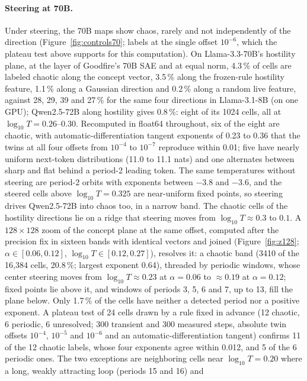 \documentclass[11pt,letterpaper]{article}
\begin{document}
\paragraph{Steering at 70B.} Under steering, the 70B maps show chaos, rarely and not independently of the
direction (Figure~\ref{fig:controls70}; labels at the single offset $10^{-6}$, which the plateau test above supports
for this computation). On Llama-3.3-70B's
hostility plane, at the layer of Goodfire's 70B SAE and at equal norm, 4.3\,\% of cells are labeled chaotic along the
concept vector, 3.5\,\% along the frozen-rule hostility feature, 1.1\,\% along a Gaussian direction and 0.2\,\% along
a random live feature, against 28, 29, 39 and 27\,\% for the same four directions in Llama-3.1-8B (on one GPU);
Qwen2.5-72B along hostility gives 0.8\,\%: eight of its 1024 cells, all at $\log_{10}T=0.26$--$0.30$. Recomputed in float64
throughout, six of the eight are chaotic, with automatic-differentiation tangent exponents of 0.23 to 0.36 that the twins at all four
offsets from $10^{-4}$ to $10^{-7}$ reproduce within 0.01; five have nearly uniform next-token distributions (11.0 to
11.1 nats) and one alternates between sharp and flat behind a period-2 leading token. The same temperatures without
steering are period-2 orbits with exponents between $-3.8$ and $-3.6$, and the steered cells above $\log_{10}T=0.325$ are
near-uniform fixed points, so steering drives Qwen2.5-72B into chaos too, in a narrow band. The chaotic cells of the hostility
directions lie on a ridge that steering moves from $\log_{10}T\approx0.3$ to $0.1$. A $128\times128$ zoom of the
concept plane at the same offset, computed after the precision fix in sixteen bands with identical vectors and joined
(Figure~\ref{fig:z128}; $\alpha\in[0.06,0.12]$, $\log_{10}T\in[0.12,0.27]$), resolves it: a chaotic band (3410 of the
16{,}384 cells, 20.8\,\%; largest exponent 0.64), threaded by periodic windows, whose center steering moves from
$\log_{10}T\approx0.23$ at $\alpha=0.06$ to $\approx0.19$ at $\alpha=0.12$; fixed points lie above it, and windows of
periods 3, 5, 6 and 7, up to 13, fill the plane below. Only 1.7\,\% of the cells have neither a detected period nor a
positive exponent. A plateau test of 24 cells drawn by a rule fixed in advance (12 chaotic, 6 periodic, 6 unresolved;
300 transient and 300 measured steps, absolute twin offsets $10^{-4}$, $10^{-5}$ and $10^{-6}$ and an automatic-differentiation tangent)
confirms 11 of the 12 chaotic labels, whose four exponents agree within 0.012, and 5 of the 6 periodic ones. The two
exceptions are neighboring cells near $\log_{10}T=0.20$ where a long, weakly attracting loop (periods 15 and 16) and
\end{document}
